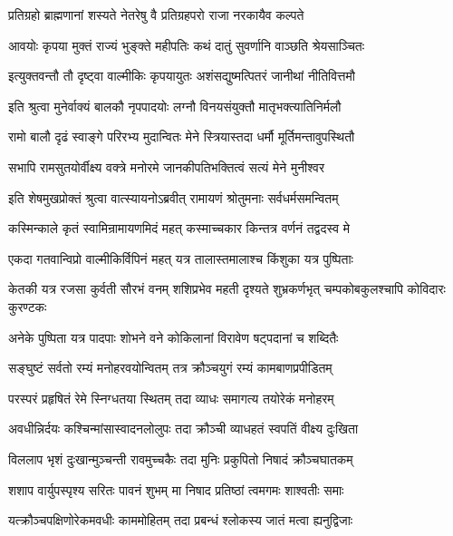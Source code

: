 \twolineshloka
{प्रतिग्रहो ब्राह्मणानां शस्यते नेतरेषु वै}
{प्रतिग्रहपरो राजा नरकायैव कल्पते}%

\twolineshloka
{आवयोः कृपया मुक्तं राज्यं भुङ्क्ते महीपतिः}
{कथं दातुं सुवर्णानि वाञ्छति श्रेयसाञ्चितः}%

\twolineshloka
{इत्युक्तवन्तौ तौ दृष्ट्वा वाल्मीकिः कृपयायुतः}
{अशंसद्युष्मत्पितरं जानीथां नीतिवित्तमौ}%

\twolineshloka
{इति श्रुत्वा मुनेर्वाक्यं बालकौ नृपपादयोः}
{लग्नौ विनयसंयुक्तौ मातृभक्त्यातिनिर्मलौ}%

\twolineshloka
{रामो बालौ दृढं स्वाङ्गे परिरभ्य मुदान्वितः}
{मेने स्त्रियास्तदा धर्मौ मूर्तिमन्तावुपस्थितौ}%

\twolineshloka
{सभापि रामसुतयोर्वीक्ष्य वक्त्रे मनोरमे}
{जानकीपतिभक्तित्वं सत्यं मेने मुनीश्वर}%

\twolineshloka
{इति शेषमुखप्रोक्तं श्रुत्वा वात्स्यायनोऽब्रवीत्}
{रामायणं श्रोतुमनाः सर्वधर्मसमन्वितम्}%


\twolineshloka
{कस्मिन्काले कृतं स्वामिन्रामायणमिदं महत्}
{कस्माच्चकार किन्तत्र वर्णनं तद्वदस्व मे}%


\twolineshloka
{एकदा गतवान्विप्रो वाल्मीकिर्विपिनं महत्}
{यत्र तालास्तमालाश्च किंशुका यत्र पुष्पिताः}%


\threelineshloka
{केतकी यत्र रजसा कुर्वती सौरभं वनम्}
{शशिप्रभेव महती दृश्यते शुभ्रकर्णभृत्}
{चम्पकोबकुलश्चापि कोविदारः कुरण्टकः}%

\twolineshloka
{अनेके पुष्पिता यत्र पादपाः शोभने वने}
{कोकिलानां विरावेण षट्पदानां च शब्दितैः}%

\twolineshloka
{सङ्घुष्टं सर्वतो रम्यं मनोहरवयोन्वितम्}
{तत्र क्रौञ्चयुगं रम्यं कामबाणप्रपीडितम्}%

\twolineshloka
{परस्परं प्रहृषितं रेमे स्निग्धतया स्थितम्}
{तदा व्याधः समागत्य तयोरेकं मनोहरम्}%

\twolineshloka
{अवधीन्निर्दयः कश्चिन्मांसास्वादनलोलुपः}
{तदा क्रौञ्ची व्याधहतं स्वपतिं वीक्ष्य दुःखिता}%

\twolineshloka
{विललाप भृशं दुःखान्मुञ्चन्ती रावमुच्चकैः}
{तदा मुनिः प्रकुपितो निषादं क्रौञ्चघातकम्}%

\twolineshloka
{शशाप वार्युपस्पृश्य सरितः पावनं शुभम्}
{मा निषाद प्रतिष्ठां त्वमगमः शाश्वतीः समाः}%

\twolineshloka
{यत्क्रौञ्चपक्षिणोरेकमवधीः काममोहितम्}
{तदा प्रबन्धं श्लोकस्य जातं मत्वा ह्यनुद्विजाः}%

